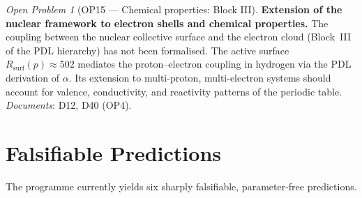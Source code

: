 \documentclass[11pt,a4paper]{article}
\theoremstyle{plain}
\theoremstyle{definition}
\theoremstyle{remark}
\newtheorem{openproblem}[theorem]{Open Problem}
\newcommand{\Rsurf}{R_{\mathrm{surf}}}
\begin{document}
\begin{openproblem}[OP15 — Chemical properties: Block III]
\label{op:chemistry}
\textbf{Extension of the nuclear framework to electron shells and chemical properties.}
The coupling between the nuclear collective surface and the electron cloud (Block~III of the PDL hierarchy) has not been formalised.
The active surface $\Rsurf(p) \approx 502$ mediates the proton--electron coupling in hydrogen via the PDL derivation of $\alpha$.
Its extension to multi-proton, multi-electron systems should account for valence, conductivity, and reactivity patterns of the periodic table.
\emph{Documents}: D12, D40 (OP4).
\end{openproblem}

\section{Falsifiable Predictions}
\label{sec:predictions}

The programme currently yields six sharply falsifiable, parameter-free predictions.
\end{document}
